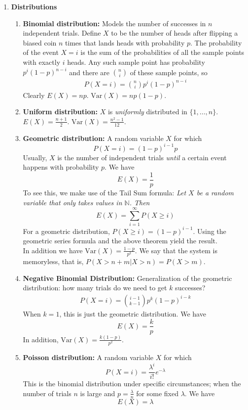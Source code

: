 \documentclass[10pt]{article}
\begin{document}
\begin{multicols}{2}
\begin{enumerate}
        \item \textbf{Distributions}
        \begin{enumerate}
            \item \textbf{Binomial distribution:} Models the number of successes in $n$ independent trials. Define $X$ to be the number of heads after flipping a biased coin $n$ times that lands heads with probability $p$. The probability of the event $X = i$ is the sum of the probabilities of all the sample points with exactly $i$ heads. Any such sample point has probability $p^i(1-p)^{n-i}$ and there are ${n \choose i}$ of these sample points, so 
            \begin{align*}
                P(X = i) = {n \choose i} p^i(1-p)^{n-i}
            \end{align*}
            Clearly $E(X)=np$. $\text{Var}(X)=np(1-p)$.
            \item \textbf{Uniform distribution:} $X$ is \textit{uniformly} distributed in $\{1,\ldots,n\}$. $E(X) = \frac{n+1}{2}$. $\text{Var}(X)=\frac{n^2-1}{12}$.
            \item \textbf{Geometric distribution:} A random variable $X$ for which $$P(X=i)=(1-p)^{i-1}p$$ Usually, $X$ is the number of independent trials \textit{until} a certain event happens with probability $p$. We have $$E(X) = \frac{1}{p}$$
            To see this, we make use of the Tail Sum formula: \textit{Let $X$ be a random variable that only takes values in $\mathbb{N}$. Then}
            $$E(X) = \sum_{i=1}^{\infty} P(X \geq i)$$
            For a geometric distribution, $P(X \geq i)=(1-p)^{i-1}$. Using the geometric series formula and the above theorem yield the result. \\ In addition we have $\text{Var}(X)=\frac{1-p}{p^2}$. We say that the system is memoryless, that is, $P(X > n+m | X > n) = P(X > m)$.
            \item \textbf{Negative Binomial Distribution:} Generalization of the geometric distribution: how many trials do we need to get $k$ successes? 
            \begin{align*}
                P(X=i)={i-1 \choose k-1} p^k (1-p)^{i-k}
            \end{align*}
            When $k=1$, this is just the geometric distribution. We have $$E(X)=\frac{k}{p}$$ In addition, $\text{Var}(X)=\frac{k(1-p)}{p^2}$. 
            \item \textbf{Poisson distribution:} A random variable $X$ for which $$P(X=i) = \frac{\lambda^i}{i!}e^{-\lambda}$$ This is the binomial distribution under specific circumstances; when the number of trials $n$ is large and $p=\frac{\lambda}{n}$ for some fixed $\lambda$. We have $$E(X)=\lambda$$

\end{enumerate}
\end{enumerate}
\end{multicols}
\end{document}

